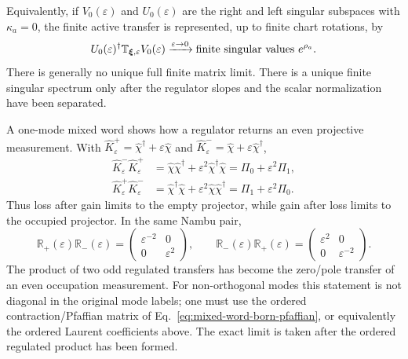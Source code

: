\documentclass[aps,prb,onecolumn,nofootinbib,superscriptaddress]{revtex4-2}
\newcommand{\bxi}{{\boldsymbol{\xi}}}
\theoremstyle{plain}
\theoremstyle{definition}
\begin{document}
Equivalently, if \(V_0(\varepsilon)\) and \(U_0(\varepsilon)\) are the right
and left singular subspaces with \(\kappa_a=0\), the finite active transfer is
represented, up to finite chart rotations, by
\begin{equation}
  U_0(\varepsilon)^\dagger
  \mathbb T_{\bxi,\varepsilon}
  V_0(\varepsilon)
  \xrightarrow{\varepsilon\to0}
  \hbox{finite singular values }e^{\rho_a}.
  \label{eq:finite-sector-compression}
\end{equation}
There is generally no unique full finite matrix limit.  There is a unique
finite singular spectrum only after the regulator slopes and the scalar
normalization have been separated.

A one-mode mixed word shows how a regulator returns an even projective
measurement.  With
\(\hat K^+_\varepsilon=\hat\chi^\dagger+\varepsilon\hat\chi\) and
\(\hat K^-_\varepsilon=\hat\chi+\varepsilon\hat\chi^\dagger\),
\begin{align}
  \hat K^-_\varepsilon\hat K^+_\varepsilon
  &=
  \hat\chi\hat\chi^\dagger
  +
  \varepsilon^2\hat\chi^\dagger\hat\chi
  =
  \Pi_0+\varepsilon^2\Pi_1,
  \label{eq:loss-gain-product-empty-projector}\\
  \hat K^+_\varepsilon\hat K^-_\varepsilon
  &=
  \hat\chi^\dagger\hat\chi
  +
  \varepsilon^2\hat\chi\hat\chi^\dagger
  =
  \Pi_1+\varepsilon^2\Pi_0 .
  \label{eq:gain-loss-product-occupied-projector}
\end{align}
Thus loss after gain limits to the empty projector, while gain after loss
limits to the occupied projector.  In the same Nambu pair,
\begin{equation}
  \mathbb R_+(\varepsilon)\mathbb R_-(\varepsilon)
  =
  \begin{pmatrix}\varepsilon^{-2}&0\\0&\varepsilon^2\end{pmatrix},
  \qquad
  \mathbb R_-(\varepsilon)\mathbb R_+(\varepsilon)
  =
  \begin{pmatrix}\varepsilon^2&0\\0&\varepsilon^{-2}\end{pmatrix}.
  \label{eq:odd-pair-projector-transfer-limit}
\end{equation}
The product of two odd regulated transfers has become the zero/pole transfer
of an even occupation measurement.  For non-orthogonal modes this statement
is not diagonal in the original mode labels; one must use the ordered
contraction/Pfaffian matrix of Eq.~\eqref{eq:mixed-word-born-pfaffian}, or
equivalently the ordered Laurent coefficients above.  The exact limit is
taken after the ordered regulated product has been formed.
\end{document}
